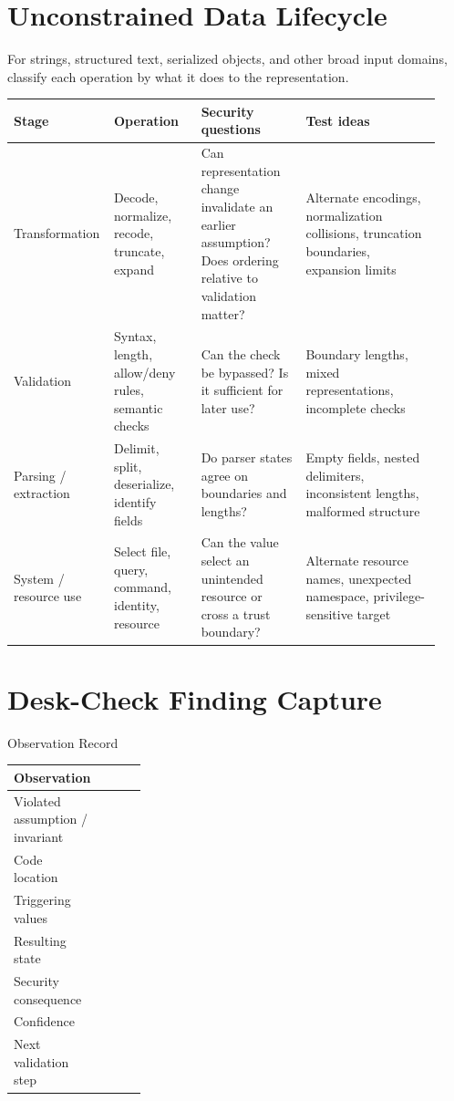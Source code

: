 \documentclass[10pt]{article}
\begin{document}
\section{Unconstrained Data Lifecycle}
For strings, structured text, serialized objects, and other broad input domains, classify each operation by what it does to the representation.
\begin{longtable}{@{}L{0.18\linewidth}L{0.20\linewidth}L{0.24\linewidth}L{0.31\linewidth}@{}}
\toprule
Stage & Operation & Security questions & Test ideas \\
\midrule
Transformation & Decode, normalize, recode, truncate, expand & Can representation change invalidate an earlier assumption? Does ordering relative to validation matter? & Alternate encodings, normalization collisions, truncation boundaries, expansion limits \\
Validation & Syntax, length, allow/deny rules, semantic checks & Can the check be bypassed? Is it sufficient for later use? & Boundary lengths, mixed representations, incomplete checks \\
Parsing / extraction & Delimit, split, deserialize, identify fields & Do parser states agree on boundaries and lengths? & Empty fields, nested delimiters, inconsistent lengths, malformed structure \\
System / resource use & Select file, query, command, identity, resource & Can the value select an unintended resource or cross a trust boundary? & Alternate resource names, unexpected namespace, privilege-sensitive target \\
\bottomrule
\end{longtable}

\section{Desk-Check Finding Capture}
\begin{worksheetbox}{Observation Record}
\par\smallskip\noindent\begin{tabularx}{\linewidth}{@{}L{0.29\linewidth}Y@{}}
Observation & \\ \midrule
Violated assumption / invariant & \\ \midrule
Code location & \\ \midrule
Triggering values & \\ \midrule
Resulting state & \\ \midrule
Security consequence & \\ \midrule
Confidence & \\ \midrule
Next validation step & \\ 
\end{tabularx}
\end{worksheetbox}
\clearpage
\end{document}
